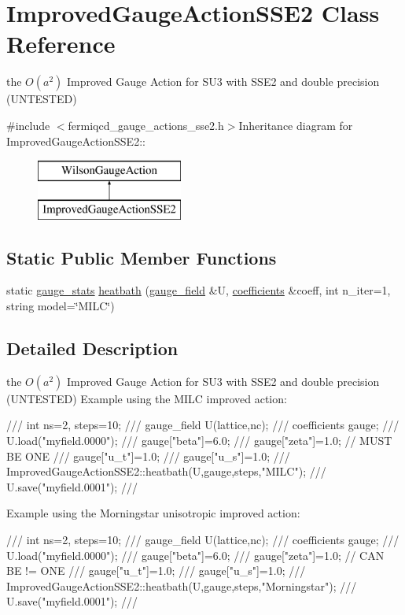 \hypertarget{class_improved_gauge_action_s_s_e2}{
\section{ImprovedGaugeActionSSE2 Class Reference}
\label{class_improved_gauge_action_s_s_e2}
}


the $ O(a^2)$ Improved Gauge Action for SU3 with SSE2 and double precision (UNTESTED)  


{\ttfamily \#include $<$fermiqcd\_\-gauge\_\-actions\_\-sse2.h$>$}Inheritance diagram for ImprovedGaugeActionSSE2::\begin{figure}[H]
\begin{center}
\leavevmode
\includegraphics[height=2cm]{class_improved_gauge_action_s_s_e2}
\end{center}
\end{figure}
\subsection*{Static Public Member Functions}
\begin{DoxyCompactItemize}
\item 
static \hyperlink{classgauge__stats}{gauge\_\-stats} \hyperlink{class_improved_gauge_action_s_s_e2_acbc479ba8ed2d4e8fbb42f703b59570c}{heatbath} (\hyperlink{classgauge__field}{gauge\_\-field} \&U, \hyperlink{classcoefficients}{coefficients} \&coeff, int n\_\-iter=1, string model=\char`\"{}MILC\char`\"{})
\end{DoxyCompactItemize}


\subsection{Detailed Description}
the $ O(a^2)$ Improved Gauge Action for SU3 with SSE2 and double precision (UNTESTED) Example using the MILC improved action: \begin{DoxyVerb}
///    int ns=2, steps=10;
///    gauge_field U(lattice,nc);
///    coefficients gauge;
///    U.load("myfield.0000");
///    gauge["beta"]=6.0;
///    gauge["zeta"]=1.0; // MUST BE ONE
///    gauge["u_t"]=1.0;
///    gauge["u_s"]=1.0;
///    ImprovedGaugeActionSSE2::heatbath(U,gauge,steps,"MILC");
///    U.save("myfield.0001");
/// \end{DoxyVerb}
 Example using the Morningstar unisotropic improved action: \begin{DoxyVerb}
///    int ns=2, steps=10;
///    gauge_field U(lattice,nc);
///    coefficients gauge;
///    U.load("myfield.0000");
///    gauge["beta"]=6.0;
///    gauge["zeta"]=1.0; // CAN BE != ONE
///    gauge["u_t"]=1.0;
///    gauge["u_s"]=1.0;
///    ImprovedGaugeActionSSE2::heatbath(U,gauge,steps,"Morningstar");
///    U.save("myfield.0001");
/// \end{DoxyVerb}
 

